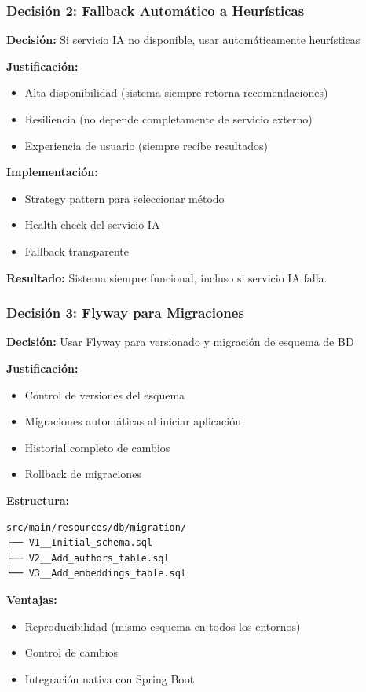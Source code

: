 \documentclass[aspectratio=169]{beamer}
\begin{document}
\begin{frame}
\frametitle{Decisión 2: Fallback Automático a Heurísticas}

\textbf{Decisión:} Si servicio IA no disponible, usar automáticamente heurísticas

\textbf{Justificación:}
\begin{itemize}
\item Alta disponibilidad (sistema siempre retorna recomendaciones)
\item Resiliencia (no depende completamente de servicio externo)
\item Experiencia de usuario (siempre recibe resultados)
\end{itemize}

\textbf{Implementación:}
\begin{itemize}
\item Strategy pattern para seleccionar método
\item Health check del servicio IA
\item Fallback transparente
\end{itemize}

\vspace{0.3cm}

\begin{tcolorbox}[colback=green!5, colframe=green!50]
\textbf{Resultado:} Sistema siempre funcional, incluso si servicio IA falla.
\end{tcolorbox}

\end{frame}

\begin{frame}
\frametitle{Decisión 3: Flyway para Migraciones}

\textbf{Decisión:} Usar Flyway para versionado y migración de esquema de BD

\textbf{Justificación:}
\begin{itemize}
\item Control de versiones del esquema
\item Migraciones automáticas al iniciar aplicación
\item Historial completo de cambios
\item Rollback de migraciones
\end{itemize}

\textbf{Estructura:}
\begin{verbatim}
src/main/resources/db/migration/
├── V1__Initial_schema.sql
├── V2__Add_authors_table.sql
└── V3__Add_embeddings_table.sql
\end{verbatim}

\textbf{Ventajas:}
\begin{itemize}
\item Reproducibilidad (mismo esquema en todos los entornos)
\item Control de cambios
\item Integración nativa con Spring Boot
\end{itemize}

\end{frame}
\end{document}
